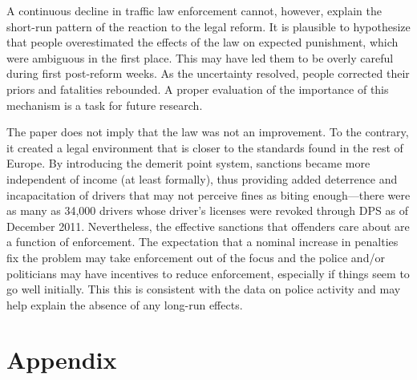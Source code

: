 \documentclass[12pt]{article}
\begin{document}
A continuous decline in traffic law enforcement cannot, however, explain the
short-run pattern of the reaction to the legal reform. It is plausible to
hypothesize that people overestimated the effects of the law on expected
punishment, which were ambiguous in the first place. This may have led them to
be overly careful during first post-reform weeks. As the uncertainty resolved,
people corrected their priors and fatalities rebounded. A proper evaluation of
the importance of this mechanism is a task for future research.

The paper does not imply that the law was not an improvement. To the contrary,
it created a legal environment that is closer to the standards found in the rest
of Europe. By introducing the demerit point system, sanctions became more
independent of income (at least formally), thus providing added deterrence and
incapacitation of drivers that may not perceive fines as biting enough---there
were as many as 34,000 drivers whose driver's licenses were revoked through DPS
as of December 2011. Nevertheless, the effective sanctions that offenders care
about are a function of enforcement. The expectation that a nominal increase in
penalties fix the problem may take enforcement out of the focus and the police
and/or politicians may have incentives to reduce enforcement, especially if
things seem to go well initially. This this is consistent with the data on
police activity and may help explain the absence of any long-run effects.





\newpage


\FloatBarrier
\appendix

\section*{Appendix} %
\setcounter{table}{0}
\renewcommand\thetable{A.\arabic{table}}
\end{document}
